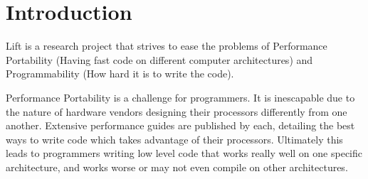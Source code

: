 \documentclass{l4proj}
\begin{document}
%
%
%
%
%
%
%
%
\chapter{Introduction} \label{introduction}



Lift is a research project that strives to ease the problems of Performance Portability (Having fast code on different computer architectures) and Programmability (How hard it is to write the code).

Performance Portability is a challenge for programmers. It is inescapable due to the nature of hardware vendors designing their processors differently from one another. Extensive performance guides are published by each, detailing the best ways to write code which takes advantage of their processors. Ultimately this leads to programmers writing low level code that works really well on one specific architecture, and works worse or may not even compile on other architectures.
\end{document}
